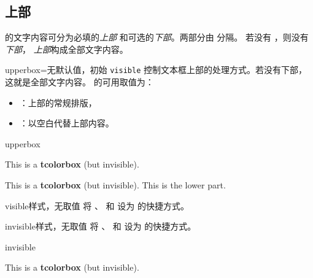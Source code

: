 \clearpage
\subsection{上部}
 的文字内容可分为必填的\emph{上部}
和可选的\emph{下部}。两部分由  分隔。
若没有 ，则没有\emph{下部}，
\emph{上部}构成全部文字内容。

\begin{docTcbKey}[][doc new=2015-01-06]{upperbox}{=}{无默认值，初始 \texttt{visible}}
  控制文本框上部的处理方式。若没有下部，这就是全部文字内容。
   的可用取值为：
  \begin{itemize}
  \item{}：上部的常规排版，
  \item{}：以空白代替上部内容。
  \end{itemize}
\begin{exdispExample}{upperbox}
\begin{tcolorbox}[upperbox=invisible,colback=white]
This is a \textbf{tcolorbox} (but invisible).
\end{tcolorbox}

\begin{tcolorbox}[upperbox=invisible,colback=white]
This is a \textbf{tcolorbox} (but invisible).
\tcblower
This is the lower part.
\end{tcolorbox}
\end{exdispExample}
\end{docTcbKey}


\begin{docTcbKey}[][doc new and updated={2015-01-06}{2019-03-01}]{visible}{}{样式，无取值}
  将 、 和 
  设为  的快捷方式。
\end{docTcbKey}

\begin{docTcbKey}[][doc new and updated={2015-01-06}{2019-03-01}]{invisible}{}{样式，无取值}
  将 、 和 
  设为  的快捷方式。
\begin{exdispExample}{invisible}
\begin{tcolorbox}[invisible]
This is a \textbf{tcolorbox} (but invisible).
\end{tcolorbox}
\end{exdispExample}
\end{docTcbKey}


